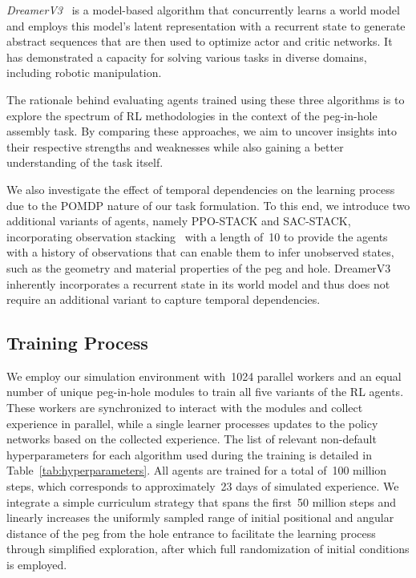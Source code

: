 \textit{DreamerV3}~\cite{hafner2023mastering} is a model-based algorithm that concurrently learns a world model and employs this model's latent representation with a recurrent state to generate abstract sequences that are then used to optimize actor and critic networks. It has demonstrated a capacity for solving various tasks in diverse domains, including robotic manipulation.

The rationale behind evaluating agents trained using these three algorithms is to explore the spectrum of RL methodologies in the context of the peg-in-hole assembly task. By comparing these approaches, we aim to uncover insights into their respective strengths and weaknesses while also gaining a better understanding of the task itself.

We also investigate the effect of temporal dependencies on the learning process due to the POMDP nature of our task formulation. To this end, we introduce two additional variants of agents, namely PPO-STACK and SAC-STACK, incorporating observation stacking~\cite{mnih2015human} with a length of~10 to provide the agents with a history of observations that can enable them to infer unobserved states, such as the geometry and material properties of the peg and hole. DreamerV3 inherently incorporates a recurrent state in its world model and thus does not require an additional variant to capture temporal dependencies.


\subsection{Training Process}\label{ssec:training-process}

We employ our simulation environment with~1024 parallel workers and an equal number of unique peg-in-hole modules to train all five variants of the RL agents. These workers are synchronized to interact with the modules and collect experience in parallel, while a single learner processes updates to the policy networks based on the collected experience. The list of relevant non-default hyperparameters for each algorithm used during the training is detailed in Table~\ref{tab:hyperparameters}. All agents are trained for a total of~100 million steps, which corresponds to approximately~23 days of simulated experience. We integrate a simple curriculum strategy that spans the first~50 million steps and linearly increases the uniformly sampled range of initial positional and angular distance of the peg from the hole entrance to facilitate the learning process through simplified exploration, after which full randomization of initial conditions is employed.

